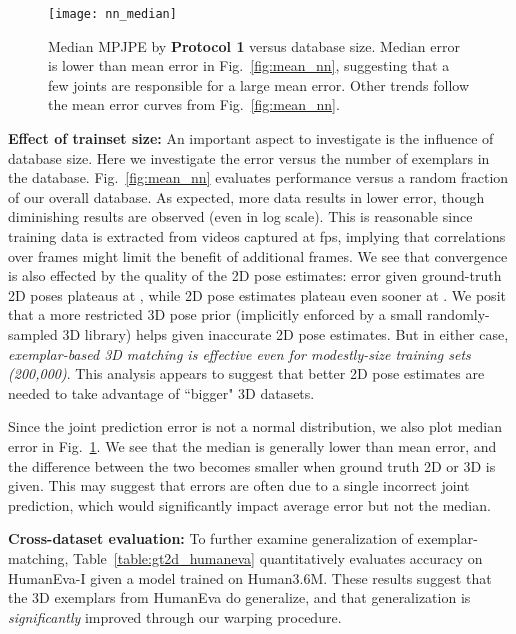 \documentclass[10pt,twocolumn,letterpaper]{article}
\begin{document}
\begin{figure}[t!]
\centering
\texttt{[image: nn\_median]}
   \caption{Median MPJPE by \textbf{Protocol 1} versus database size. Median error is lower than mean error in Fig.~\ref{fig:mean_nn}, suggesting that a few joints are responsible for a large mean error. Other trends follow the mean error curves from Fig.~\ref{fig:mean_nn}.}
\label{fig:median_nn}
\end{figure}

{\bf Effect of trainset size:} An important aspect to investigate is the influence of database size. Here we investigate the error versus the number of exemplars in the database. Fig.~\ref{fig:mean_nn} evaluates performance versus a random fraction of our overall database. As expected, more data results in lower error, though diminishing results are observed (even in log scale). This is reasonable since training data is extracted from videos captured at  fps, implying that correlations over frames might limit the benefit of additional frames. We see that convergence is also effected by the quality of the 2D pose estimates: error given ground-truth 2D poses plateaus at , while 2D pose estimates plateau even sooner at . We posit that a more restricted 3D pose prior (implicitly enforced by a small randomly-sampled 3D library) helps given inaccurate 2D pose estimates. But in either case, {\em exemplar-based 3D matching is effective even for modestly-size training sets (200,000)}. This analysis appears to suggest that better 2D pose estimates are needed to take advantage of ``bigger" 3D datasets.


Since the joint prediction error is not a normal distribution, we also plot median error in Fig.~\ref{fig:median_nn}.
We see that the median is generally lower than mean error, and the difference between the two becomes smaller when ground truth 2D or 3D is given. This may suggest that errors are often due to a single incorrect joint prediction, which would significantly impact average error but not the median.


{\bf Cross-dataset evaluation:} To further examine generalization of exemplar-matching, Table~\ref{table:gt2d_humaneva} quantitatively evaluates accuracy on HumanEva-I \cite{sigal2010humaneva} given a model trained on Human3.6M. These results suggest that the 3D exemplars from HumanEva do generalize, and that generalization is {\em significantly} improved through our warping procedure.
\end{document}
